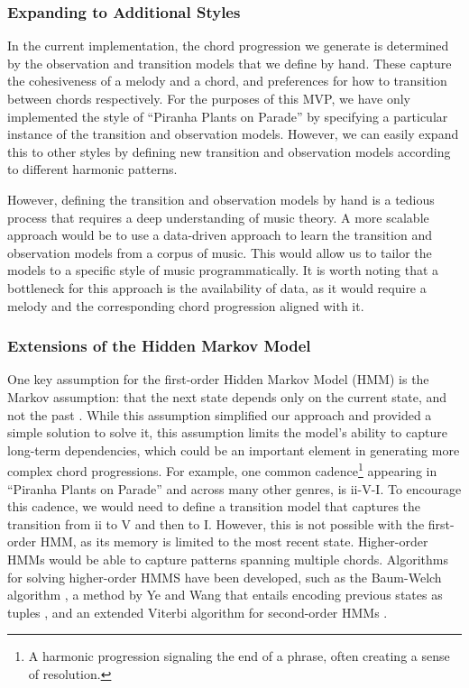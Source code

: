 \subsubsection{Expanding to Additional Styles}

In the current implementation, the chord progression we generate is determined by the observation and transition models that we define by hand. These capture the cohesiveness of a melody and a chord, and preferences for how to transition between chords respectively. For the purposes of this MVP, we have only implemented the style of ``Piranha Plants on Parade'' by specifying a particular instance of the transition and observation models. However, we can easily expand this to other styles by defining new transition and observation models according to different harmonic patterns.

However, defining the transition and observation models by hand is a tedious process that requires a deep understanding of music theory. A more scalable approach would be to use a data-driven approach to learn the transition and observation models from a corpus of music. This would allow us to tailor the models to a specific style of music programmatically. It is worth noting that a bottleneck for this approach is the availability of data, as it would require a melody and the corresponding chord progression aligned with it.

\subsubsection{Extensions of the Hidden Markov Model}

One key assumption for the first-order Hidden Markov Model (HMM) is the Markov assumption: that the next state depends only on the current state, and not the past \autocite{SpeechLang:2025}. While this assumption simplified our approach and provided a simple solution to solve it, this assumption limits the model's ability to capture long-term dependencies, which could be an important element in generating more complex chord progressions. For example, one common cadence\footnote{A harmonic progression signaling the end of a phrase, often creating a sense of resolution.} appearing in ``Piranha Plants on Parade'' and across many other genres, is ii-V-I. To encourage this cadence, we would need to define a transition model that captures the transition from ii to V and then to I. However, this is not possible with the first-order HMM, as its memory is limited to the most recent state. Higher-order HMMs would be able to capture patterns spanning multiple chords. Algorithms for solving higher-order HMMS have been developed, such as the Baum-Welch algorithm \autocite{BaumWelch:1970}, a method by Ye and Wang that entails encoding previous states as tuples \autocite{DecodeHMM:2014}, and an extended Viterbi algorithm for second-order HMMs \autocite{Viterbi2:1988}.

